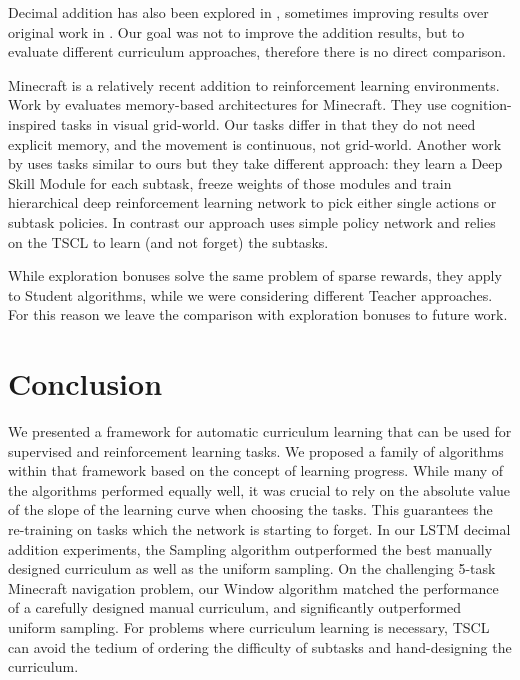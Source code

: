 \documentclass{article}
\begin{document}
Decimal addition has also been explored in \citep{kalchbrenner2015grid, reed2015neural, kaiser2015neural}, sometimes improving results over original work in \citep{Zaremba2014}. Our goal was not to improve the addition results, but to evaluate different curriculum approaches, therefore there is no direct comparison.

Minecraft is a relatively recent addition to reinforcement learning environments. Work by \citep{oh2016control} evaluates memory-based architectures for Minecraft. They use cognition-inspired tasks in visual grid-world. Our tasks differ in that they do not need explicit memory, and the movement is continuous, not grid-world. Another work by \citep{tessler2016deep} uses tasks similar to ours but they take different approach: they learn a Deep Skill Module for each subtask, freeze weights of those modules and train hierarchical deep reinforcement learning network to pick either single actions or subtask policies. In contrast our approach uses simple policy network and relies on the TSCL to learn (and not forget) the subtasks.

While exploration bonuses \citep{bellemare2016unifying,houthooft2016vime,stadie2015incentivizing} solve the same problem of sparse rewards, they apply to Student algorithms, while we were considering different Teacher approaches. For this reason we leave the comparison with exploration bonuses to future work.



\section{Conclusion}
We presented a framework for automatic curriculum learning that can be used for supervised and reinforcement learning tasks. We proposed a family of algorithms within that framework based on the concept of learning progress. While many of the algorithms performed equally well, it was crucial to rely on the absolute value of the slope of the learning curve when choosing the tasks. This guarantees the re-training on tasks which the network is starting to forget. In our LSTM decimal addition experiments, the Sampling algorithm outperformed the best manually designed curriculum as well as the uniform sampling. On the challenging 5-task Minecraft navigation problem, our Window algorithm matched the performance of a carefully designed manual curriculum, and significantly outperformed uniform sampling. For problems where curriculum learning is necessary, TSCL can avoid the tedium of ordering the difficulty of subtasks and hand-designing the curriculum.
\end{document}
